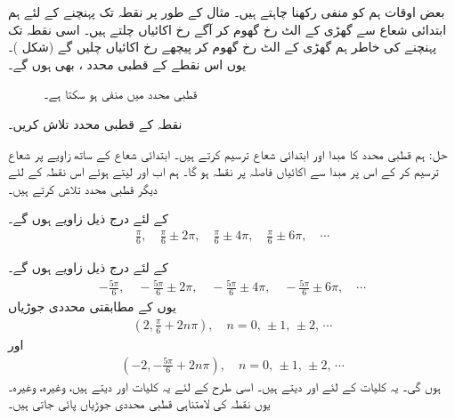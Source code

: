 بعض اوقات ہم  کو منفی رکھنا چاہتے ہیں۔ مثال کے طور پر نقطہ  تک پہنچنے کے لئے ہم ابتدائی شعاع سے گھڑی کے الٹ رخ  گھوم کر آگے رخ  اکائیاں چلتے ہیں۔ اسی نقطہ تک پہنچنے کی خاطر ہم گھڑی کے الٹ رخ  گھوم کر پیچھے رخ  اکائیاں چلیں گے (شکل )۔ یوں اس نقطے کے قطبی محدد ،  بھی ہوں گے۔
\begin{figure}
\centering
\begin{minipage}{0.45\textwidth}
\centering
{}
\caption{قطبی محدد میں  منفی ہو سکتا ہے۔}
\label{شکل_مخروط_منفی_قطبی_رداس}
\end{minipage}
\end{figure}

نقطہ  کے قطبی محدد تلاش کریں۔

حل:\quad
ہم قطبی محدد کا مبدا اور ابتدائی شعاع ترسیم کرتے ہیں۔ ابتدائی شعاع  کے ساتھ  زاویے پر شعاع ترسیم کر کے اس پر مبدا سے  اکائیاں فاصلہ پر نقطہ  ہو گا۔ ہم اب  اور  لیتے ہوئے اس نقطہ کے لئے  دیگر قطبی محدد تلاش کرتے ہیں۔

 کے لئے درج ذیل زاویے ہوں گے۔
\begin{align*}
\frac{\pi}{6},\quad \frac{\pi}{6}\pm 2\pi,\quad \frac{\pi}{6}\pm 4\pi,\quad \frac{\pi}{6}\pm 6\pi,\quad \cdots
\end{align*}

 کے لئے درج ذیل زاویے ہوں گے۔
\begin{align*}
-\frac{5\pi}{6},\quad -\frac{5\pi}{6}\pm 2\pi,\quad -\frac{5\pi}{6}\pm 4\pi,\quad -\frac{5\pi}{6}\pm 6\pi,\quad \cdots
\end{align*}
یوں  کے مطابقتی محددی جوڑیاں
\begin{align*}
(2,\tfrac{\pi}{6}+ 2n\pi),\quad n=0,\, \pm 1,\, \pm 2,\,\cdots
\end{align*}
اور
\begin{align*}
(-2,-\tfrac{5\pi}{6}+2n\pi),\quad n=0,\, \pm 1,\, \pm 2,\,\cdots
\end{align*}
ہوں گی۔ یہ کلیات  کے لئے  اور  دیتے ہیں۔ اسی طرح  کے لئے یہ کلیات   اور   دیتے ہیں، وغیرہ، وغیرہ۔ یوں نقطہ  کی لامتناہی قطبی محددی جوڑیاں پائی جاتی ہیں۔

